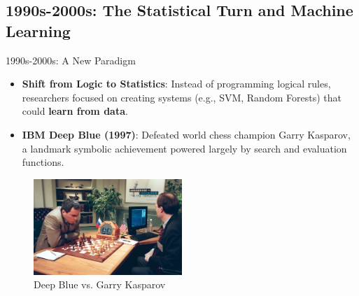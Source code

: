 \documentclass{beamer}
\begin{document}
\subsection{1990s-2000s: The Statistical Turn and Machine Learning}

\begin{frame}[t]{1990s-2000s: A New Paradigm}
\begin{itemize}
    \item \textbf{Shift from Logic to Statistics}: Instead of programming logical rules, researchers focused on creating systems (e.g., SVM, Random Forests) that could \textbf{learn from data}.
    \item \textbf{IBM Deep Blue (1997)}: Defeated world chess champion Garry Kasparov, a landmark symbolic achievement powered largely by search and evaluation functions.
\end{itemize}
    \begin{figure}
        \includegraphics[width=0.5\textwidth]{images/Garry-Kasparov-Deep-Blue-IBM-computer.jpg}
        \caption{Deep Blue vs. Garry Kasparov}
    \end{figure}
\end{frame}
\end{document}
